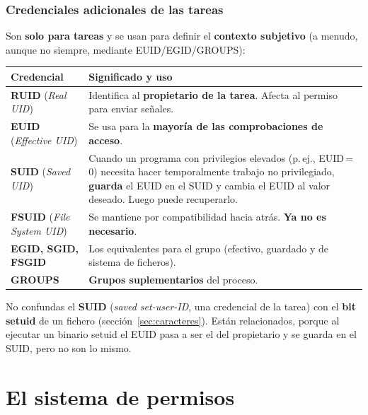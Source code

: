 \documentclass[11pt,a4paper]{report}
\begin{document}
\subsection{Credenciales adicionales de las tareas}
 
Son \textbf{solo para tareas} y se usan para definir el \textbf{contexto subjetivo} (a menudo, aunque no siempre, mediante EUID/EGID/GROUPS):
 
\begin{center}
\small
{\setlength{\aboverulesep}{0pt}\setlength{\belowrulesep}{0pt}\renewcommand{\arraystretch}{1.3}%
\begin{tabularx}{\linewidth}{>{\raggedright\arraybackslash}p{3.6cm} !{\color{gray!45}\vrule width 0.2pt} >{\raggedright\arraybackslash}X}
\toprule
\textbf{Credencial} & \textbf{Significado y uso} \\
\midrule
\textbf{RUID} (\emph{Real UID}) & Identifica al \textbf{propietario de la tarea}. Afecta al permiso para enviar señales. \\
\textbf{EUID} (\emph{Effective UID}) & Se usa para la \textbf{mayoría de las comprobaciones de acceso}. \\
\textbf{SUID} (\emph{Saved UID}) & Cuando un programa con privilegios elevados (p.\,ej., EUID\,=\,0) necesita hacer temporalmente trabajo no privilegiado, \textbf{guarda} el EUID en el SUID y cambia el EUID al valor deseado. Luego puede recuperarlo. \\
\textbf{FSUID} (\emph{File System UID}) & Se mantiene por compatibilidad hacia atrás. \textbf{Ya no es necesario}. \\
\textbf{EGID, SGID, FSGID} & Los equivalentes para el grupo (efectivo, guardado y de sistema de ficheros). \\
\textbf{GROUPS} & \textbf{Grupos suplementarios} del proceso. \\
\bottomrule
\end{tabularx}}
\end{center}
 
\begin{importante}
No confundas el \textbf{SUID} (\emph{saved set-user-ID}, una credencial de la tarea) con el \textbf{bit setuid} de un fichero (sección~\ref{sec:caracteres}). Están relacionados, porque al ejecutar un binario setuid el EUID pasa a ser el del propietario y se guarda en el SUID, pero no son lo mismo.
\end{importante}
 
\chapter{El sistema de permisos}
 
\end{document}
